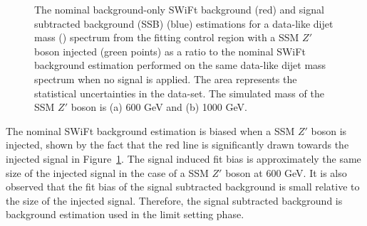 \begin{figure}[!ht]
  \begin{center}
    \captionsetup[subfigure]{aboveskip=0pt,justification=centering}
  \end{center}
  \vspace{-1mm}
  \caption{The nominal background-only SWiFt background (red) and signal subtracted background (SSB) (blue) estimations
    for a data-like dijet mass (\mjj) spectrum from the fitting control region with a SSM $Z'$ boson injected (green points)
    as a ratio to the nominal SWiFt background estimation performed on the same data-like dijet mass spectrum when no signal is applied.
    The area represents the statistical uncertainties in the data-set.
    The simulated mass of the SSM $Z'$ boson is (a) 600 GeV and (b) 1000 GeV.}
  \label{fig:lim-lowmass_ssb_test}
\end{figure}

The nominal SWiFt background estimation is biased when a SSM $Z'$ boson is injected,
shown by the fact that the red line is significantly drawn towards the injected signal in Figure~\ref{fig:lim-lowmass_ssb_test}.
The signal induced fit bias is approximately the same size of the injected signal in the case of a SSM $Z'$ boson at 600 GeV.
It is also observed that the fit bias of the signal subtracted background is small relative to the size of the injected signal.
Therefore, the signal subtracted background is background estimation used in the limit setting phase.

